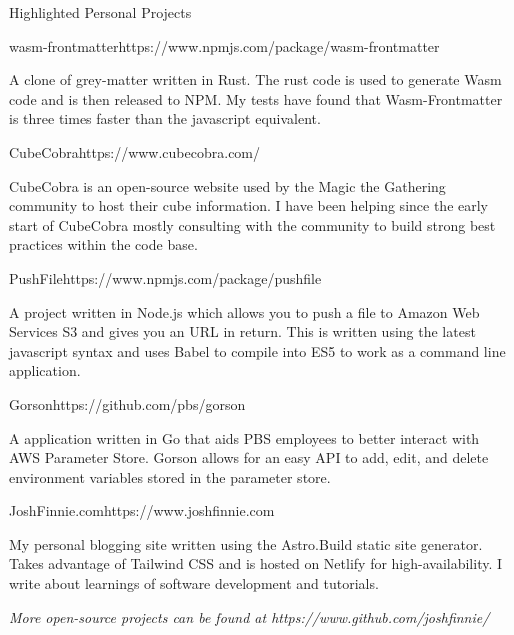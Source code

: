 \documentclass{bluefin_cv}
\begin{document}
\begin{bfcvSection}{Highlighted Personal Projects}

\begin{bfcvProjSubsection}{wasm-frontmatter}{https://www.npmjs.com/package/wasm-frontmatter}
\item A clone of grey-matter written in Rust. The rust code is used to generate Wasm code and is then released to NPM. My tests have found that Wasm-Frontmatter is three times faster than the javascript equivalent.
\end{bfcvProjSubsection}

\begin{bfcvProjSubsection}{CubeCobra}{https://www.cubecobra.com/}
\item CubeCobra is an open-source website used by the Magic the Gathering community to host their cube information. I have been helping since the early start of CubeCobra mostly consulting with the community to build strong best practices within the code base.
\end{bfcvProjSubsection}

\begin{bfcvProjSubsection}{PushFile}{https://www.npmjs.com/package/pushfile}
\item A project written in Node.js which allows you to push a file to Amazon Web Services S3 and gives you an URL in return. This is written using the latest javascript syntax and uses Babel to compile into ES5 to work as a command line application.
\end{bfcvProjSubsection}

\begin{bfcvProjSubsection}{Gorson}{https://github.com/pbs/gorson}
\item A application written in Go that aids PBS employees to better interact with AWS Parameter Store. Gorson allows for an easy API to add, edit, and delete environment variables stored in the parameter store.
\end{bfcvProjSubsection}

\begin{bfcvProjSubsection}{JoshFinnie.com}{https://www.joshfinnie.com}
\item My personal blogging site written using the Astro.Build static site generator. Takes advantage of Tailwind CSS and is hosted on Netlify for high-availability. I write about learnings of software development and tutorials.
\end{bfcvProjSubsection}

\smallskip
\centerline{\textsl{More open-source projects can be found at https://www.github.com/joshfinnie/}}

\end{bfcvSection}
\end{document}
